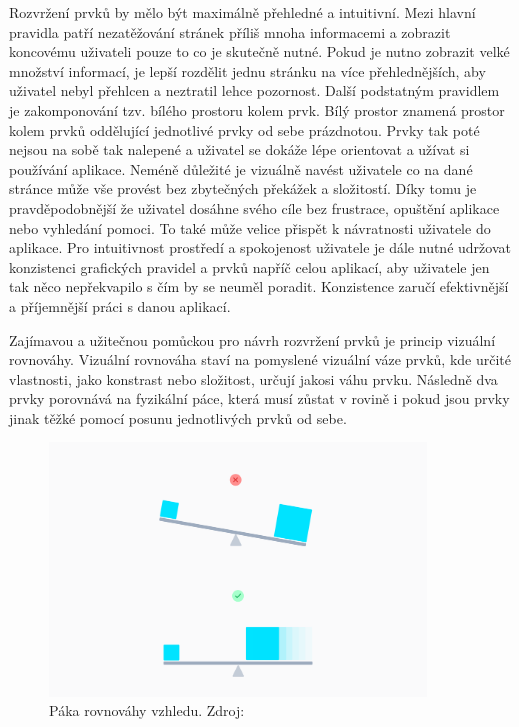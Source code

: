 		Rozvržení prvků by mělo být maximálně přehledné a intuitivní.
		Mezi hlavní pravidla patří nezatěžování stránek příliš mnoha informacemi a zobrazit koncovému uživateli pouze to
		co je skutečně nutné.
		Pokud je nutno zobrazit velké množství informací, je lepší rozdělit jednu stránku na více přehlednějších, aby
		uživatel nebyl přehlcen a neztratil lehce pozornost.
		Další podstatným pravidlem je zakomponování tzv. bílého prostoru kolem prvk.
		Bílý prostor znamená prostor kolem prvků oddělující jednotlivé prvky od sebe prázdnotou.
		Prvky tak poté nejsou na sobě tak nalepené a uživatel se dokáže lépe orientovat a užívat si používání aplikace.
		Neméně důležité je vizuálně navést uživatele co na dané stránce může vše provést bez zbytečných překážek a
		složitostí.
		Díky tomu je pravděpodobnější že uživatel dosáhne svého cíle bez frustrace, opuštění aplikace nebo vyhledání
		pomoci.
		To také může velice přispět k návratnosti uživatele do aplikace.
		Pro intuitivnost prostředí a spokojenost uživatele je dále nutné udržovat konzistenci grafických pravidel a prvků
		napříč celou aplikací, aby uživatele jen tak něco nepřekvapilo s čím by se neuměl poradit.
		Konzistence zaručí efektivnější a příjemnější práci s danou aplikací.
		\cite{create_great_ux}

		Zajímavou a užitečnou pomůckou pro návrh rozvržení prvků je princip vizuální rovnováhy.
		Vizuální rovnováha staví na pomyslené vizuální váze prvků, kde určité vlastnosti, jako konstrast nebo složitost,
		určují jakosi váhu prvku.
		Následně dva prvky porovnává na fyzikální páce, která musí zůstat v rovině i pokud jsou prvky jinak těžké pomocí
		posunu jednotlivých prvků od sebe.

		\begin{figure}[H]
			\centering
			\includegraphics[width=10cm]{obrazky/rovnovaha_paka}\hfill
			\caption{Páka rovnováhy vzhledu. Zdroj: \cite{vizualni_rovnovaha}}
		\end{figure}

